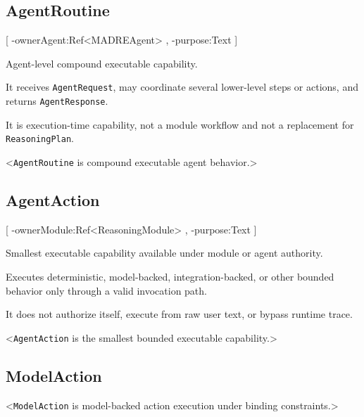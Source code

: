 \documentclass[11pt]{report}
\begin{document}
\subsection{AgentRoutine}
[
	\UMLAt-ownerAgent:Ref<MADREAgent> ,
	\UMLAt-purpose:Text
]{%
	\item[] Agent-level compound executable capability.
	\item[] It receives \texttt{AgentRequest}, may coordinate several lower-level steps or actions, and returns \texttt{AgentResponse}.
	\item[] It is execution-time capability, not a module workflow and not a replacement for \texttt{ReasoningPlan}.
}<\texttt{AgentRoutine} is compound executable agent behavior.>

\subsection{AgentAction}
[
	\UMLAt-ownerModule:Ref<ReasoningModule> ,
	\UMLAt-purpose:Text
]{%
	\item[] Smallest executable capability available under module or agent authority.
	\item[] Executes deterministic, model-backed, integration-backed, or other bounded behavior only through a valid invocation path.
	\item[] It does not authorize itself, execute from raw user text, or bypass runtime trace.
}<\texttt{AgentAction} is the smallest bounded executable capability.>

\subsection{ModelAction}
<\texttt{ModelAction} is model-backed action execution under binding constraints.>
\end{document}

